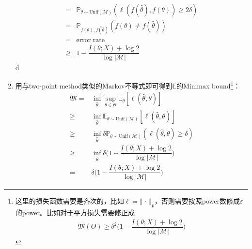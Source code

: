 \documentclass[11pt,a4paper]{ctexart}
\numberwithin{equation}{section}%
\begin{document}
\begin{enumerate}[topsep=2pt,itemsep=0pt]
\begin{align*}
        =&  \mathbb{P}_{\theta \sim \mathrm{ Unif }(\mathcal{M})}\left( \ell(f(\hat{\theta }),f(\theta) )\geq 2\delta \right) \\
        =& \mathbb{P}_{f(\theta),f(\hat{\theta })}\left( f(\theta )\neq f(\hat{\theta }) \right)\\
        =& \text{error rate}\\ 
        \geq & 1-\dfrac{ I(\theta ;X)+\log 2 }{ \log \left\vert \mathcal{M} \right\vert  } 
    \end{align*}
d
    \item 用与two-point method类似的Markov不等式即可得到$ \mathbb{E} $的Minimax bound\footnote{这里的损失函数需要是齐次的，比如$ \ell = \left\Vert \, \cdot \,  \right\Vert _p $，否则需要按照power数修成$ \varepsilon  $的power。比如对于平方损失需要修正成
    \begin{align*}
        \mathfrak{M}(\Theta)\geq \delta^2 \big(1-\dfrac{ I(\theta ;X)+\log 2 }{ \log \left\vert \mathcal{M} \right\vert  }\big)
    \end{align*}
    }：
    \begin{align*}
        \mathfrak{M} =& \mathop{ \inf  }\limits_{\hat{\theta }} \mathop{ \sup  }\limits_{\theta \in \Theta} \mathbb{E}_\theta\left[ \ell(\hat{\theta},\theta) \right] \\
        \geq & \mathop{ \inf  }\limits_{\hat{\theta }} \mathbb{E}_{\theta \sim \mathrm{ Unif }(\mathcal{M}) }\left[  \ell(\hat{\theta},\theta) \right] \\
        \geq & \mathop{ \inf  }\limits_{\hat{\theta }} \delta \mathbb{P}_{\theta \sim \mathrm{ Unif }(\mathcal{M})}\left( \ell(\hat{\theta},\theta) \geq \delta  \right)\\
        \geq & \mathop{ \inf  }\limits_{\hat{\theta }} \delta \big(1-\dfrac{ I(\theta ;X)+\log 2 }{ \log \left\vert \mathcal{M} \right\vert  }\big)\\
        =&  \delta \big(1-\dfrac{ I(\theta ;X)+\log 2 }{ \log \left\vert \mathcal{M} \right\vert  }\big)
    \end{align*}
    
    
    
    
    
    
    





    

\end{enumerate}
\end{document}
